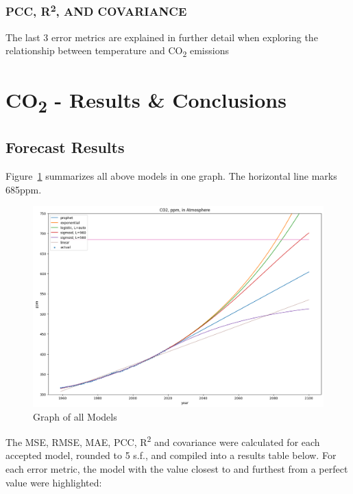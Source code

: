 \documentclass[12pt]{mcmthesis}
\begin{document}
    \subsubsection*{PCC, R\textsuperscript{2}, AND COVARIANCE}
    The last 3 error metrics are explained in further detail when exploring the relationship between temperature and CO\textsubscript{2} emissions



    \section{CO\textsubscript{2} - Results \& Conclusions}

    \subsection{Forecast Results}

    Figure~\ref{fig:co2_all} summarizes all above models in one graph.
    The horizontal line marks 685\si{ppm}.

    \begin{figure}[h]
        \centering
        \includegraphics[width=\linewidth]{co2_pred_all}
        \caption{Graph of all Models}
        \label{fig:co2_all}
    \end{figure}


    The MSE, RMSE, MAE, PCC, R\textsuperscript{2} and covariance were calculated for each accepted model, rounded to 5 s.f., and compiled into a results table below. For each error metric, the model with the value closest to and furthest from a perfect value were highlighted:
\end{document}
